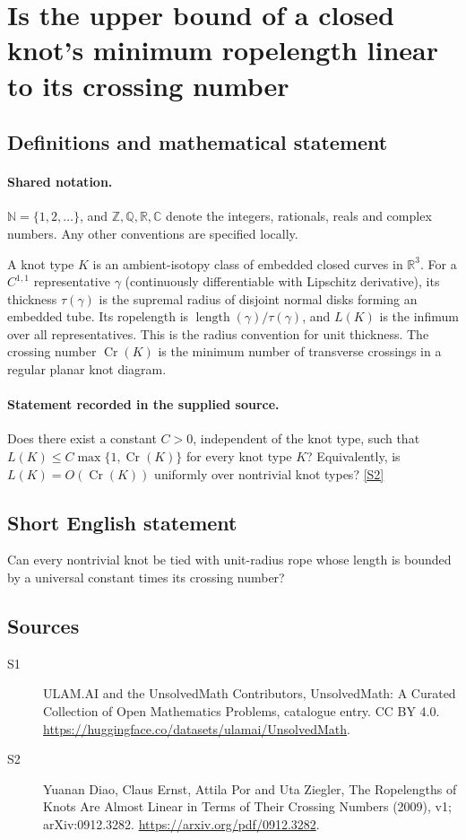 \documentclass[11pt]{article}
\newcommand{\sref}[2]{\hyperlink{source:#1:#2}{[S#2]}}
\begin{document}
\section{Is the upper bound of a closed knot's minimum ropelength linear to its crossing number}\label{statement}

\subsection{Definitions and mathematical statement}

\paragraph{Shared notation.}$\mathbb N=\{1,2,\ldots\}$, and $\mathbb Z,\mathbb Q,\mathbb R,\mathbb C$ denote the integers, rationals, reals and complex numbers. Any other conventions are specified locally.


A knot type $K$ is an ambient-isotopy class of embedded closed curves in $\mathbb R^3$. For a $C^{1,1}$ representative $\gamma$ (continuously differentiable with Lipschitz derivative), its thickness $\tau(\gamma)$ is the supremal radius of disjoint normal disks forming an embedded tube. Its ropelength is $\operatorname{length}(\gamma)/\tau(\gamma)$, and $L(K)$ is the infimum over all representatives. This is the radius convention for unit thickness. The crossing number $\operatorname{Cr}(K)$ is the minimum number of transverse crossings in a regular planar knot diagram.
\paragraph{Statement recorded in the supplied source.}
Does there exist a constant $C>0$, independent of the knot type, such that $L(K)\leq C\max\{1,\operatorname{Cr}(K)\}$ for every knot type $K$? Equivalently, is $L(K)=O(\operatorname{Cr}(K))$ uniformly over nontrivial knot types? \sref{statement}{2}
\subsection{Short English statement}
Can every nontrivial knot be tied with unit-radius rope whose length is bounded by a universal constant times its crossing number?
\subsection{Sources}
\begin{description}
\item[\hypertarget{source:statement:1}{S1}] ULAM.AI and the UnsolvedMath Contributors, UnsolvedMath: A Curated Collection of Open Mathematics Problems, catalogue entry. CC BY 4.0. \url{https://huggingface.co/datasets/ulamai/UnsolvedMath}.
\item[\hypertarget{source:statement:2}{S2}] Yuanan Diao, Claus Ernst, Attila Por and Uta Ziegler, The Ropelengths of Knots Are Almost Linear in Terms of Their Crossing Numbers (2009), v1; arXiv:0912.3282. \url{https://arxiv.org/pdf/0912.3282}.
\end{description}
\label{end:statement}
\end{document}

